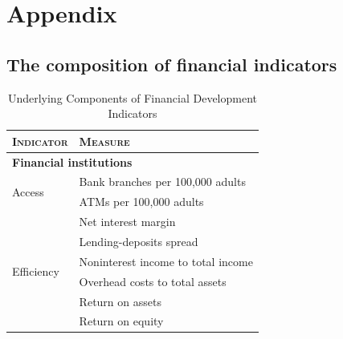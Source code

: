 \begin{refsection}



\clearpage
%
%
%
%
%
\printbibliography[heading=subbibliography]
%
%
%
%
%
\newpage
%
%
%
%
%
\section*{Appendix}
\label{ch4sec:appch2}
\begin{subappendices}
\section{The composition of financial indicators}
\label{ch4subsec:finind_comp}
\begin{table}[ht!]
    \small
    \caption{Underlying Components of Financial Development Indicators}
    \label{ch4tab:finind}
    \centering
    \begin{tabular}{ll}
      \toprule
      \textsc{Indicator} & \textsc{Measure} \\
      \midrule
      \multicolumn{2}{l}{\textbf{Financial institutions}} \\
      \midrule
      \multirow{2}{*}{Access} 	& Bank branches per 100,000 adults \\
                                  & ATMs per 100,000 adults \\
      \midrule
      \multirow{6}{*}{Efficiency}		& Net interest margin \\
                                  & Lending-deposits spread \\ 
                                  & Noninterest income to total income \\
                                  & Overhead costs to total assets \\
                                  & Return on assets \\
                                  & Return on equity \\
            

\end{tabular}
\end{table}
\end{subappendices}
\end{refsection}

